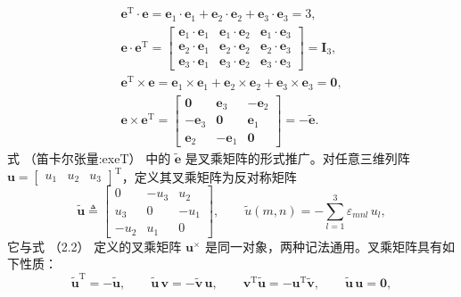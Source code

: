 \begin{gather*}\boldsymbol{e}^{\mathrm{T}} \cdot \boldsymbol{e}
= \mathbf{e}_1\cdot\mathbf{e}_1 + \mathbf{e}_2\cdot\mathbf{e}_2 + \mathbf{e}_3\cdot\mathbf{e}_3 = 3,
\\[2pt]
\boldsymbol{e} \cdot \boldsymbol{e}^{\mathrm{T}}
=
\begin{bmatrix}
\mathbf{e}_1\!\cdot\!\mathbf{e}_1 & \mathbf{e}_1\!\cdot\!\mathbf{e}_2 & \mathbf{e}_1\!\cdot\!\mathbf{e}_3 \\
\mathbf{e}_2\!\cdot\!\mathbf{e}_1 & \mathbf{e}_2\!\cdot\!\mathbf{e}_2 & \mathbf{e}_2\!\cdot\!\mathbf{e}_3 \\
\mathbf{e}_3\!\cdot\!\mathbf{e}_1 & \mathbf{e}_3\!\cdot\!\mathbf{e}_2 & \mathbf{e}_3\!\cdot\!\mathbf{e}_3
\end{bmatrix}
= \boldsymbol{I}_3,
\\[2pt]
\boldsymbol{e}^{\mathrm{T}} \times \boldsymbol{e}
= \mathbf{e}_1\times\mathbf{e}_1 + \mathbf{e}_2\times\mathbf{e}_2 + \mathbf{e}_3\times\mathbf{e}_3 = \boldsymbol{0},
\\[2pt]
\boldsymbol{e} \times \boldsymbol{e}^{\mathrm{T}}
=
\begin{bmatrix}
\boldsymbol{0} & \mathbf{e}_3 & -\mathbf{e}_2 \\
-\mathbf{e}_3 & \boldsymbol{0} & \mathbf{e}_1 \\
\mathbf{e}_2 & -\mathbf{e}_1 & \boldsymbol{0}
\end{bmatrix}
= -\tilde{\boldsymbol{e}}.
\end{gather*}
式 （笛卡尔张量:exeT） 中的 $\tilde{\boldsymbol{e}}$ 是叉乘矩阵的形式推广。对任意三维列阵 $\boldsymbol{u}=\begin{bmatrix}u_1&u_2&u_3\end{bmatrix}^{\mathrm{T}}$，定义其叉乘矩阵为反对称矩阵
\[
\tilde{\boldsymbol{u}} \triangleq
\begin{bmatrix}
0 & -u_3 & u_2 \\
u_3 & 0 & -u_1 \\
-u_2 & u_1 & 0
\end{bmatrix},
\qquad \tilde{u}(m,n) = -\sum_{l=1}^{3}\varepsilon_{mnl}\,u_l,
\]
它与式 （2.2） 定义的叉乘矩阵 $\boldsymbol{u}^{\times}$ 是同一对象，两种记法通用。叉乘矩阵具有如下性质：
\[
\tilde{\boldsymbol{u}}^{\mathrm{T}} = -\tilde{\boldsymbol{u}}, \qquad
\tilde{\boldsymbol{u}}\,\boldsymbol{v} = -\tilde{\boldsymbol{v}}\,\boldsymbol{u}, \qquad
\boldsymbol{v}^{\mathrm{T}}\tilde{\boldsymbol{u}} = -\boldsymbol{u}^{\mathrm{T}}\tilde{\boldsymbol{v}}, \qquad
\tilde{\boldsymbol{u}}\,\boldsymbol{u} = \boldsymbol{0},
\]
